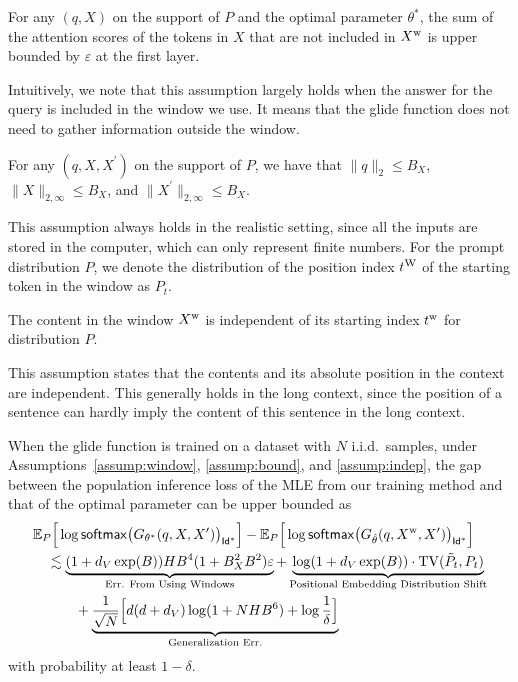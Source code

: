 \begin{assumption}\label{assump:window}
    For any $(q,X)$ on the support of $P$ and the optimal parameter $\theta^{*}$, the sum of the attention scores of the tokens in $X$ that are not included in $X^{\mathrm{w}}$ is upper bounded by $\varepsilon$ at the first layer.
\end{assumption}
Intuitively, we note that this assumption largely holds when the answer for the query is included in the window we use. It means that the glide function does not need to gather information outside the window.
\begin{assumption}\label{assump:bound}
    For any $(q,X,X^{\prime})$ on the support of $P$, we have that $\|q\|_{2}\leq B_X$, $\|X\|_{2,\infty}\leq B_X$, and $\|X^{\prime}\|_{2,\infty}\leq B_X$.
\end{assumption}
This assumption always holds in the realistic setting, since all the inputs are stored in the computer, which can only represent finite numbers. For the prompt distribution $P$, we denote the distribution of the position index $t^{\mathrm{W}}$ of the starting token in the window as $P_t$. 
\begin{assumption}
    The content in the window $X^{\mathrm{w}}$ is independent of its starting index $t^{\mathrm{w}}$ for distribution $P$.
\end{assumption}\label{assump:indep}
This assumption states that the contents and its absolute position in the context are independent. This generally holds in the long context, since the position of a sentence can hardly imply the content of this sentence in the long context.
\begin{theorem}\label{thm:main}
    When the glide function is trained on a dataset with $N$ i.i.d.\ samples, under Assumptions~\ref{assump:window}, \ref{assump:bound}, and \ref{assump:indep}, the gap between the population inference loss of the MLE from our training method and that of the optimal parameter can be upper bounded as
    \begin{align*}
        &\mathbb{E}_{P}\Big[\log \mathsf{softmax}\big( G_{\theta^{*}}(q,X,X^{\prime})\big)_{\mathsf{Id}^{*}}\Big]- \mathbb{E}_{P}\Big[\log \mathsf{softmax}\big( G_{\hat{\theta}}(q,X^{\mathrm{w}},X^{\prime})\big)_{\mathsf{Id}^{*}}\Big]\nonumber\\
        &\quad \lesssim \underbrace{(1+d_V\exp(B))HB^{4}(1+B_{X}^2B^2)\varepsilon}_{\text{Err. From Using Windows}} + \underbrace{\log (1+d_V\exp(B))\cdot \mathop{\mathrm{TV}}(\tilde{P}_t,P_t)}_{\text{Positional Embedding Distribution Shift}}\nonumber\\
        &\quad\qquad + \underbrace{\frac{1}{\sqrt{N}}\Big[d(d+d_V)\log (1+NHB^6)+\log\frac{1}{\delta}\Big]}_{\text{Generalization Err.}}
    \end{align*}
    with probability at least $1-\delta$.
\end{theorem}
